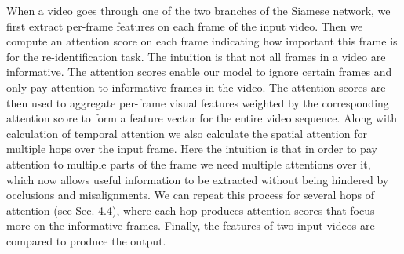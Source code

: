 \documentclass[sigconf, authordraft,review=false]{acmart}
\begin{document}
When a video goes through one of the two branches of
the Siamese network, we first extract per-frame features on
each  frame  of  the  input  video.   Then  we  compute  an  attention score on each frame indicating how important this
frame is for the re-identification task.  The intuition is that
not  all  frames  in  a  video  are  informative.   The  attention
scores enable our model to ignore certain frames and only
pay attention to informative frames in the video.   The attention scores are then used to aggregate per-frame visual
features weighted by the corresponding attention score to
form a feature vector for the entire video sequence. Along with calculation of temporal attention we also calculate the spatial attention for multiple hops over the input frame. Here the intuition is that in order to pay attention to multiple parts of the frame we need multiple attentions over it, which now allows useful information to be extracted without being hindered by occlusions and misalignments.  We can repeat this process for several hops of attention (see Sec.   4.4),  where each hop
produces attention scores that focus more on the informative frames.  Finally,  the features of two input videos are
compared to produce the output.
\end{document}
